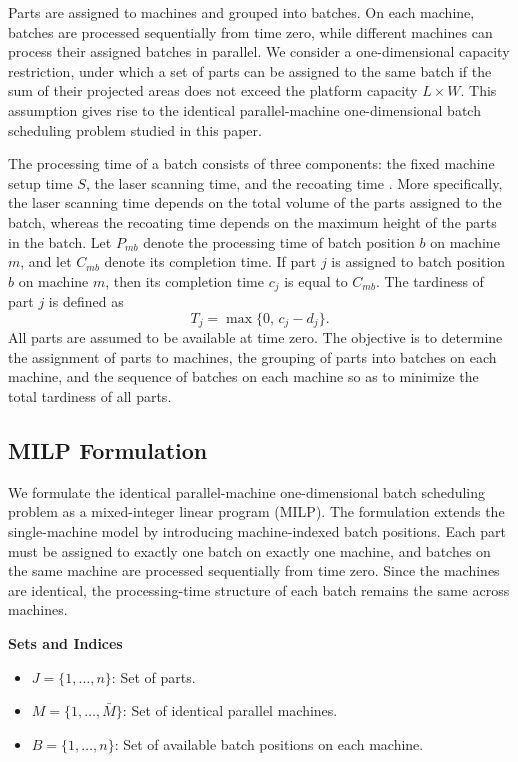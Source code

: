 \documentclass[letterpaper, 10 pt, conference]{ieeeconf}  %
\begin{document}
Parts are assigned to machines and grouped into batches. On each machine,
batches are processed sequentially from time zero, while different machines
can process their assigned batches in parallel. We consider a
one-dimensional capacity restriction, under which a set of parts can be
assigned to the same batch if the sum of their projected areas does not
exceed the platform capacity $L \times W$. This assumption gives rise to the
identical parallel-machine one-dimensional batch scheduling problem studied
in this paper.

The processing time of a batch consists of three components: the fixed
machine setup time $S$, the laser scanning time, and the recoating time
\cite{cheMachineSchedulingOrientation2021}. More specifically, the laser
scanning time depends on the total volume of the parts assigned to the
batch, whereas the recoating time depends on the maximum height of the parts
in the batch. Let $P_{mb}$ denote the processing time of batch position $b$
on machine $m$, and let $C_{mb}$ denote its completion time. If part $j$ is
assigned to batch position $b$ on machine $m$, then its completion time
$c_j$ is equal to $C_{mb}$. The tardiness of part $j$ is defined as
\[
T_j=\max\{0,\,c_j-d_j\}.
\]
All parts are assumed to be available at time zero. The objective is to
determine the assignment of parts to machines, the grouping of parts into
batches on each machine, and the sequence of batches on each machine so as
to minimize the total tardiness of all parts.

\subsection{MILP Formulation}
We formulate the identical parallel-machine one-dimensional batch scheduling problem as a mixed-integer linear program (MILP). The formulation extends the single-machine model by introducing machine-indexed batch positions. Each part must be assigned to exactly one batch on exactly one machine, and batches on the same machine are processed sequentially from time zero. Since the machines are identical, the processing-time structure of each batch remains the same across machines.

\noindent \textbf{Sets and Indices}
\begin{itemize}
	\item $J = \{1, \dots, n\}$: Set of parts.
	\item $M = \{1, \dots, \bar M\}$: Set of identical parallel machines.
	\item $B = \{1, \dots, n\}$: Set of available batch positions on each machine.
\end{itemize}
\end{document}
